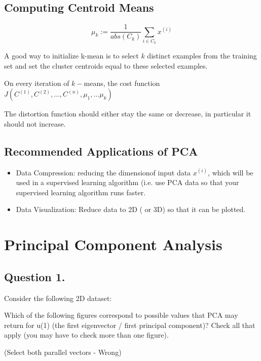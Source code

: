 \subsection{Computing Centroid Means}

\[ 
\mu_k := \frac{1}{abs(C_k)} \sum_{i \in C_k} x^{(i)}
\]

A good way to initialize k-mean is to select $k$ distinct examples from the training set and set the cluster centroids equal to these selected examples.

On every iteration of $k-$means, the cost function $J(C^{(1)},C^{(2)},\ldots, C^{(n)},
\mu_1,\ldots \mu_k)$

The distortion function should either stay the same or decrease, in particular it should not increase.

\subsection{Recommended Applications of PCA}

\begin{itemize}
\item Data Compression: reducing the dimensionof input data $x^{(i)}$, which will be used in a supervised learning algorithm
(i.e. use PCA data so that your supervised learning algorithm runs faster.

\item Data Visualization: Reduce data to 2D ( or 3D) so that it can be plotted.
\end{itemize}

\section{Principal Component Analysis}


\subsection{ Question 1. }

Consider the following 2D dataset:


Which of the following figures correspond to possible values that PCA may return for u(1) (the first eigenvector / first principal component)? 
Check all that apply (you may have to check more than one figure).

(Select both parallel vectors - Wrong)








